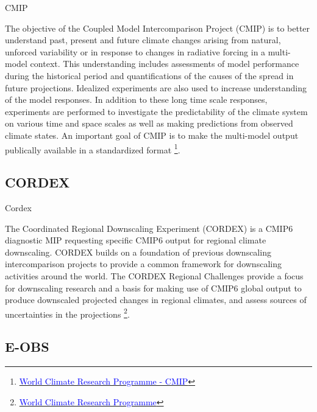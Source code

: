 \documentclass[xcolor={dvipsnames}]{beamer}
\begin{document}
\begin{frame}{CMIP}

The objective of the Coupled Model Intercomparison Project (CMIP) is to better understand past, present and future climate changes arising from natural, unforced variability or in response to changes in radiative forcing in a multi-model context. This understanding includes assessments of model performance during the historical period and quantifications of the causes of the spread in future projections. Idealized experiments are also used to increase understanding of the model responses. In addition to these long time scale responses, experiments are performed to investigate the predictability of the climate system on various time and space scales as well as making predictions from observed climate states. An important goal of CMIP is to make the multi-model output publically available in a standardized format \footnote{\href{https://www.wcrp-climate.org/wgcm-cmip}{\textcolor{blue}{World Climate Research Programme - CMIP}}}.

\end{frame}

\subsection{CORDEX}

\begin{frame}{Cordex}

The Coordinated Regional Downscaling Experiment (CORDEX) is a CMIP6 diagnostic MIP requesting specific CMIP6 output for regional climate downscaling. CORDEX builds on a foundation of previous downscaling intercomparison projects to provide a common framework for downscaling activities around the world. The CORDEX Regional Challenges provide a focus for downscaling research and a basis for making use of CMIP6 global output to produce downscaled projected changes in regional climates, and assess sources of uncertainties in the projections \footnote{\href{https://www.wcrp-climate.org/}{\textcolor{blue}{World Climate Research Programme}}}.
    
\end{frame}

\subsection{E-OBS}
\end{document}
